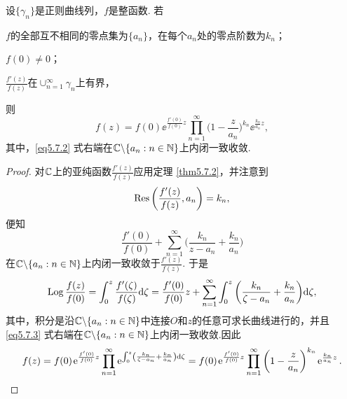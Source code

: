 \begin{theorem}\label{thm5.7.3}
设$\{\gamma_n\}$是正则曲线列，$f$是整函数. 若
\begin{eenum}
  \item $f$的全部互不相同的零点集为$\{a_n\}$，在每个$a_n$处的零点阶数为$k_n$；
  \item $f(0)\ne0$；
  \item $\frac{f'(z)}{f(z)}$在$\operatorname*{\cup}_{n=1}^\infty\gamma_n$上有界，
\end{eenum}
则
\begin{equation}\label{eq5.7.2}
f(z)=f(0)\ee^{\frac{f'(0)}{f(0)}z}\prod_{n=1}^\infty\bigg(1-\frac z{a_n}\bigg)
^{k_n}\ee^{\frac{k_n}{a_n}z},
\end{equation}
其中，\eqref{eq5.7.2} 式右端在$\mathbb C\backslash\{a_n:n\in\mathbb N\}$上内闭一致收敛.
\end{theorem}
\begin{proof}
对$\mathbb C$上的亚纯函数$\frac{f'(z)}{f(z)}$应用定理 \ref{thm5.7.2}，并注意到
\[\operatorname*{Res}\bigg(\frac{f'(z)}{f(z)},a_n\bigg)=k_n,\]
便知
\[\frac{f'(0)}{f(0)}+\sum_{n=1}^\infty\bigg(\frac{k_n}{z-a_n}+\frac{k_n}{a_n}\bigg)\]
在$\mathbb C\backslash\{a_n:n\in\mathbb N\}$上内闭一致收敛于$\frac{f'(z)}{f(z)}$. 于是
\begin{equation}\label{eq5.7.3}
\operatorname{Log}\frac{f(z)}{f(0)}=\int_0^z\frac{f'(\zeta)}{f(\zeta)}\textrm d\zeta=\frac{f'(0)}{f(0)}z+\sum_{n=1}^\infty\int_0^z\bigg(\frac{k_n}{\zeta-a_n}+
\frac{k_n}{a_n}\bigg)\textrm d\zeta,
\end{equation}
其中，积分是沿$\mathbb C\backslash\{a_n:n\in\mathbb N\}$中连接$O$和$z$的任意可求长曲线进行的，并且 \eqref{eq5.7.3} 式右端在$\mathbb C\backslash\{a_n:n\in\mathbb N\}$上内闭一致收敛.因此
\begin{equation*}
f(z)=f(0)\ee^{\frac{f'(0)}{f(0)}z}\prod_{n=1}^\infty\ee^{\int_0^z\left(\frac{k_n}{\zeta-a_n}+
\frac{k_n}{a_n}\right)\textrm d\zeta}
=f(0)\ee^{\frac{f'(0)}{f(0)}z}\prod_{n=1}^\infty\bigg(1-\frac z{a_n}\bigg)
^{k_n}\ee^{\frac{k_n}{a_n}z}.
\end{equation*}
\end{proof}

